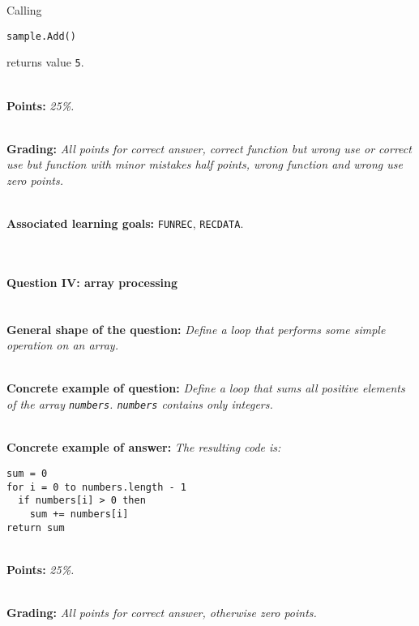 \documentclass[12pt,a4paper,final]{article}
\begin{document}
Calling

\begin{lstlisting}
sample.Add()
\end{lstlisting}

returns value \texttt{5}.

\ \\ 

\textbf{Points:} \textit{25\%.}

\ \\ 

\textbf{Grading:} \textit{All points for correct answer, correct function but wrong use or correct use but function with minor mistakes half points, wrong function and wrong use zero points.}

\ \\ 

\textbf{Associated learning goals:} \texttt{FUNREC}, \texttt{RECDATA}.

\ \\ 

\paragraph{Question IV: array processing} \ \\

\textbf{General shape of the question:} \textit{Define a loop that performs some simple operation on an array.}

\ \\ 

\textbf{Concrete example of question:} \textit{Define a loop that sums all positive elements of the array \texttt{numbers}. \texttt{numbers} contains only integers.}

\ \\ 

\textbf{Concrete example of answer:} \textit{The resulting code is:}

\begin{lstlisting}
sum = 0
for i = 0 to numbers.length - 1
  if numbers[i] > 0 then
    sum += numbers[i]
return sum
\end{lstlisting}

\ \\ 

\textbf{Points:} \textit{25\%.}

\ \\ 

\textbf{Grading:} \textit{All points for correct answer, otherwise zero points.}
\end{document}
